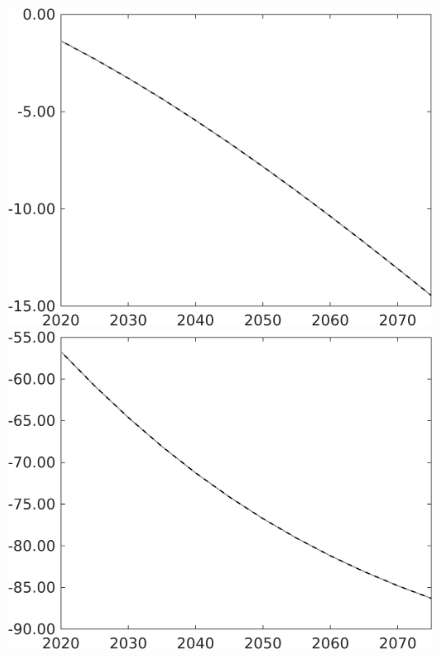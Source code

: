 \documentclass[12pt]{article}
\begin{document}
\begin{figure}[h!!]
\begin{minipage}[]{0.32\textwidth}
	\end{minipage}	
	\begin{minipage}[]{0.32\textwidth}
		\includegraphics[width=1\textwidth]{../../codding_model/own_basedOnFried/optimalPol_010922_revision/figures/all_13Sept22/PerdifNoTauf_regime0_CompTaul_pg_spillover0_nsk1_xgr0_knspil1_sep1_LFlimit0_emsbase0_countec0_GovRev0_etaa0.79_lgd0.png}
	\end{minipage}	
	\begin{minipage}[]{0.32\textwidth}
		\includegraphics[width=1\textwidth]{../../codding_model/own_basedOnFried/optimalPol_010922_revision/figures/all_13Sept22/PerdifNoTauf_regime0_CompTaul_pgpftf_spillover0_nsk1_xgr0_knspil1_sep1_LFlimit0_emsbase0_countec0_GovRev0_etaa0.79_lgd0.png}

\end{minipage}
\end{figure}
\end{document}
